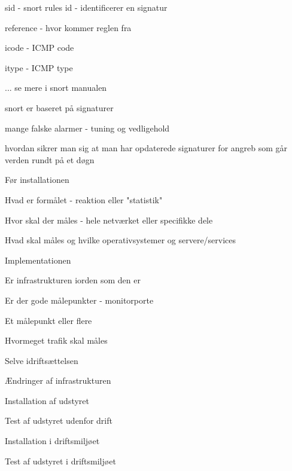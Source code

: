\documentclass[Screen16to9,17pt]{foils}
\begin{document}
\begin{list2}
\item sid - snort rules id - identificerer en signatur
\item reference - hvor kommer reglen fra
\item icode - ICMP code
\item itype - ICMP type
\item ... se mere i snort manualen
\end{list2}



\begin{list1}
\item snort er baseret på signaturer
\item mange falske alarmer - tuning og vedligehold
\item hvordan sikrer man sig at man har opdaterede signaturer for
  angreb som går verden rundt på et døgn
\end{list1}


\begin{list1}
\item Før installationen
\begin{list2}
\item Hvad er formålet - reaktion eller "statistik"
\item Hvor skal der måles - hele netværket eller specifikke dele
\item Hvad skal måles og hvilke operativsystemer og servere/services
\end{list2}
\item Implementationen
\begin{list2}
\item Er infrastrukturen iorden som den er
\item Er der gode målepunkter - monitorporte
\item Et målepunkt eller flere
\item Hvormeget trafik skal måles
\end{list2}
\item Selve idriftsættelsen
\begin{list2}
\item Ændringer af infrastrukturen
\item Installation af udstyret
\item Test af udstyret udenfor drift
\item Installation i driftsmiljøet
\item Test af udstyret i driftsmiljøet
\end{list2}
\end{list1}
\end{document}
